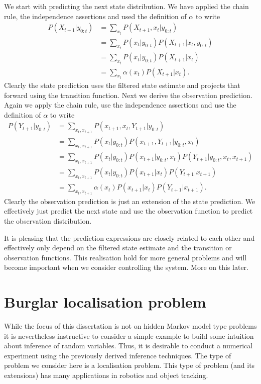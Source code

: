 We start with predicting the next state distribution. We have applied the chain rule, the independence assertions and used the definition of $\alpha$ to write
\begin{equation}
\begin{aligned}
P(X_{t+1}|y_{0:t}) &= \sum_{x_t} P(X_{t+1}, x_t|y_{0:t}) \\
&= \sum_{x_t} P(x_t|y_{0:t})P(X_{t+1}|x_t, y_{0:t}) \\
&= \sum_{x_t} P(x_t|y_{0:t})P(X_{t+1}|x_t) \\
&= \sum_{x_t} \alpha(x_t)P(X_{t+1}|x_t).
\end{aligned}
\label{eq_prediction_state}
\end{equation}
Clearly the state prediction uses the filtered state estimate and projects that forward using the transition function. Next we derive the observation prediction. Again we apply the chain rule, use the independence assertions and use the definition of $\alpha$ to write
\begin{equation}
\begin{aligned}
P(Y_{t+1}|y_{0:t}) &= \sum_{x_t, x_{t+1}} P(x_{t+1}, x_t, Y_{t+1}|y_{0:t})\\
&= \sum_{x_t, x_{t+1}} P(x_t|y_{0:t})P(x_{t+1}, Y_{t+1}|y_{0:t}, x_t) \\
&= \sum_{x_t, x_{t+1}} P(x_t|y_{0:t})P(x_{t+1}|y_{0:t}, x_t)P(Y_{t+1}|y_{0:t}, x_t, x_{t+1}) \\
&= \sum_{x_t, x_{t+1}} P(x_t|y_{0:t})P(x_{t+1}|x_t)P(Y_{t+1}|x_{t+1}) \\
&= \sum_{x_t, x_{t+1}} \alpha(x_t)P(x_{t+1}|x_t)P(Y_{t+1}|x_{t+1}).
\end{aligned}
\label{eq_prediction_observation}
\end{equation}
Clearly the observation prediction is just an extension of the state prediction. We effectively just predict the next state and use the observation function to predict the observation distribution.

It is pleasing that the prediction expressions are closely related to each other and effectively only depend on the filtered state estimate and the transition or observation functions. This realisation hold for more general problems and will become important when we consider controlling the system. More on this later.

\section{Burglar localisation problem}
While the focus of this dissertation is not on hidden Markov model type problems it is nevertheless instructive to consider a simple example to build some intuition about inference of random variables. Thus, it is desirable to conduct a numerical experiment using the previously derived inference techniques. The type of problem we consider here is a localisation problem. This type of problem (and its extensions) has many applications in robotics and object tracking.


